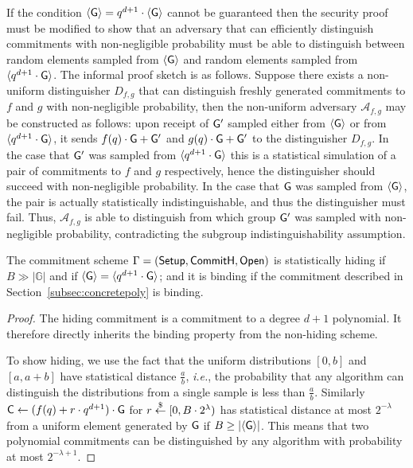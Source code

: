 If the condition $\langle \gr{g} \rangle = {q^{d+1}} \cdot \langle \gr{g}\rangle$ cannot be guaranteed then the security proof must be modified to show that an adversary that can efficiently distinguish commitments with non-negligible probability must be able to distinguish between random elements sampled from $\langle \gr{g} \rangle$ and random elements sampled from $\langle q^{d+1}\cdot \gr{g} \rangle$. The informal proof sketch is as follows. 
Suppose there exists a non-uniform distinguisher $D_{f,g}$ that can distinguish freshly generated commitments to $f$ and $g$ with non-negligible probability, then the non-uniform adversary $\mathcal{A}_{f,g}$ may be constructed as follows: upon receipt of $\gr{g}'$ sampled either from $\langle \gr{g} \rangle$ or from $\langle  q^{d+1}\cdot \gr{g}\rangle$, it sends $f(q)\cdot \gr{g}+ \gr{g}'$ and $g(q)\cdot \gr{g}+ \gr{g}'$ to the distinguisher $D_{f,g}$. 
In the case that $\gr{g}'$ was sampled from $\langle  q^{d+1}\cdot \gr{g} \rangle$ this is a statistical simulation of a pair of commitments to $f$ and $g$ respectively, hence the distinguisher should succeed with non-negligible probability. In the case that $\gr{g}$ was sampled from $\langle \gr{g} \rangle$, the pair is actually statistically indistinguishable, and thus the distinguisher must fail. Thus, $\mathcal{A}_{f,g}$ is able to distinguish from which group $\gr{g}'$ was sampled with non-negligible probability, contradicting the subgroup indistinguishability assumption. 

\begin{theorem}\label{thm:hiding}
The commitment scheme $\Gamma = (\textsf{{Setup}}, \textsf{{CommitH}}, \textsf{{Open}})$ is statistically hiding if $B \gg |\mathbb{G}|$ and if $\langle \gr{g} \rangle = \langle q^{d+1}\cdot \gr{g} \rangle$; and it is binding if the commitment described in Section~\ref{subsec:concretepoly} is binding.
\end{theorem}

\begin{proof}
The hiding commitment is a commitment to a degree $d+1$ polynomial. It therefore directly inherits the binding property from the non-hiding scheme.

To show hiding, we use the fact that the uniform distributions $[0,b]$ and $[a,a+b]$ have statistical distance $\frac{a}{b}$, \emph{i.e.}, the probability that any algorithm can distinguish the distributions from a single sample is less than $\frac{a}{b}$. Similarly $\gr{C}\gets ({f(q)+r\cdot q^{d+1}}) \cdot \gr{g}$ for $r\overset{\$}{\gets}[0,B\cdot 2^{\lambda})$ has statistical distance at most $2^{-\lambda}$ from a uniform element generated by $\gr{g}$ if $B\geq |\langle \gr{g}\rangle|$. This means that two polynomial commitments can be distinguished by any algorithm with probability at most $2^{-\lambda+1}$.
\end{proof}


